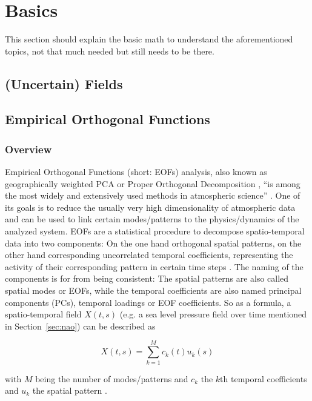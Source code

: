 
\chapter{Basics}
\label{ch:basics}

This section should explain the basic math to understand the aforementioned topics, not that much needed but still needs to be there.

\section{(Uncertain) Fields}
\label{sec:uncertainfields}

\section{Empirical Orthogonal Functions}
\label{sec:eof}


\subsection{Overview}

Empirical Orthogonal Functions (short: EOFs) analysis, also known as geographically weighted PCA or Proper Orthogonal Decomposition \cite{vietinghoffdiss}, \enquote{is among the most widely and extensively used methods in atmospheric science} \cite{hannachi_empirical_2007}. 
One of its goals is to reduce the usually very high dimensionality of atmospheric data and can be used to link certain modes/patterns to the physics/dynamics of the analyzed system.  
EOFs are a statistical procedure to decompose spatio-temporal data into two components: On the one hand orthogonal spatial patterns, on the other hand corresponding uncorrelated temporal coefficients, representing the activity of their corresponding pattern in certain time steps \cite{hannachi_empirical_2007, vietinghoffdiss}. 
The naming of the components is for from being consistent: The spatial patterns are also called spatial modes or EOFs, while the temporal coefficients are also named principal components (PCs), temporal loadings or EOF coefficients. 
So as a formula, a spatio-temporal field $X(t, s)$ (e.g. a sea level pressure field over time mentioned in Section~\ref{sec:nao}) can be described as

\begin{equation}
  X(t, s) = \sum^{M}_{k=1} c_k(t) u_k(s)
  \label{eq:eof decomposition}
\end{equation}

with $M$ being the number of modes/patterns and  $c_k$ the $k$th temporal coefficients and $u_k$ the spatial pattern \cite{hannachi_empirical_2007}. 

